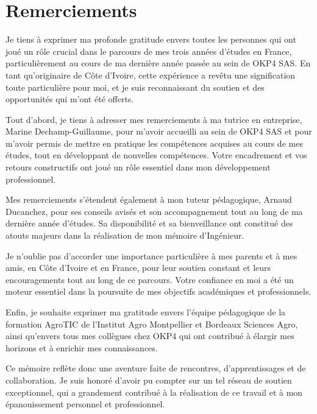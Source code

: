 \chapter*{Remerciements}
\thispagestyle{plain}

Je tiens à exprimer ma profonde gratitude envers toutes les personnes qui ont joué un rôle crucial dans le parcours de mes trois années d'études en France, particulièrement au cours de ma dernière année passée au sein de OKP4 SAS. En tant qu'originaire de Côte d'Ivoire, cette expérience a revêtu une signification toute particulière pour moi, et je suis reconnaissant du soutien et des opportunités qui m'ont été offerts.

Tout d'abord, je tiens à adresser mes remerciements à ma tutrice en entreprise, Marine Dechamp-Guillaume, pour m'avoir accueilli au sein de OKP4 SAS et pour m'avoir permis de mettre en pratique les compétences acquises au cours de mes études, tout en développant de nouvelles compétences. Votre encadrement et vos retours constructifs ont joué un rôle essentiel dans mon développement professionnel.

Mes remerciements s'étendent également à mon tuteur pédagogique, Arnaud Ducanchez, pour ses conseils avisés et son accompagnement tout au long de ma dernière année d'études. Sa disponibilité et sa bienveillance ont constitué des atouts majeurs dans la réalisation de mon mémoire d'Ingénieur.

Je n'oublie pas d'accorder une importance particulière à mes parents et à mes amis, en Côte d'Ivoire et en France, pour leur soutien constant et leurs encouragements tout au long de ce parcours. Votre confiance en moi a été un moteur essentiel dans la poursuite de mes objectifs académiques et professionnels.

Enfin, je souhaite exprimer ma gratitude envers l'équipe pédagogique de la formation AgroTIC de l'Institut Agro Montpellier et Bordeaux Sciences Agro, ainsi qu'envers tous mes collègues chez OKP4 qui ont contribué à élargir mes horizons et à enrichir mes connaissances.

Ce mémoire reflète donc une aventure faite de rencontres, d'apprentissages et de collaboration. Je suis honoré d'avoir pu compter sur un tel réseau de soutien exceptionnel, qui a grandement contribué à la réalisation de ce travail et à mon épanouissement personnel et professionnel.